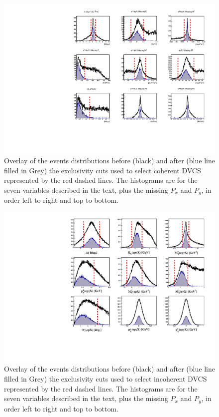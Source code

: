 \documentclass[aps,prc,preprint,superscriptaddress]{revtex4}
\begin{document}
\begin{figure}[tbp!]
\center
\includegraphics[trim=20 10 20 5,clip,width=15cm]{fig3/all_coh_exc_cuts.pdf}
	\caption{Overlay of the events distributions before (black) and after (blue line filled
	in Grey) the exclusivity cuts used to select coherent DVCS represented by the 
	red dashed lines. The histograms are for the seven variables described in the text, 
	plus the missing $P_x$ and $P_y$, in order left to right and top to bottom.}
\label{fig:CohExcCuts}
\end{figure}

\begin{figure}[tbp!]
\center
\includegraphics[trim=20 10 20 5,clip,width=15cm]{fig3/all_incoh_exc_cuts.pdf}
\caption{Overlay of the events distributions before (black) and after (blue line filled
	in Grey) the exclusivity cuts used to select incoherent DVCS represented by the 
	red dashed lines. The histograms are for the seven variables described in the text, 
	plus the missing $P_x$ and $P_y$, in order left to right and top to bottom.}
\label{fig:IncExcCuts}
\end{figure}
\end{document}
